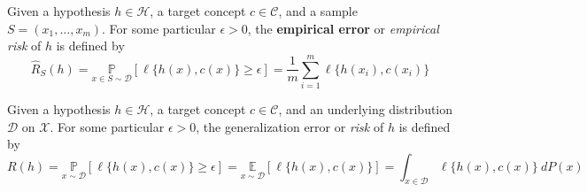 \documentclass[10pt,oneside,oldfontcommands,dvipsnames,article]{memoir}
\begin{document}
\begin{definition}
    Given a hypothesis $h\in \mathcal{H}$, a target concept $c\in \mathcal{C}$, and a sample $S=(x_{1},\dots,x_{m})$. For some particular $\epsilon>0$, the \textbf{empirical error} or \textit{empirical risk} of $h$ is defined by\begin{equation}
        \hat{R}_{S}(h) = \underset{x\in S\sim\mathcal{D}}{\mathbb{P}} [\ell\{h(x),c(x)\}\geq \epsilon] =\frac{1}{m} \sum_{i=1}^{m} \ell\{h(x_i),c(x_i)\}
    \end{equation}
\end{definition}

\begin{definition}
    Given a hypothesis $h\in\mathcal{H}$, a target concept $c\in\mathcal{C}$, and an underlying distribution $\mathcal{D}$ on $\mathcal{X}$. For some particular $\epsilon>0$, the generalization error or \textit{risk} of $h$ is defined by
    \begin{equation}
        R(h) = \underset{x\sim\mathcal{D}}{\mathbb{P}} [\ell\{h(x),c(x)\}\geq \epsilon] = \underset{x\sim\mathcal{D}}{\mathbb{E}}[\ell\{h(x),c(x)\}] = \int_{x\in \mathcal{D}} \ell\{h(x),c(x)\} \: dP(x)
    \end{equation}
\end{definition}
\end{document}
